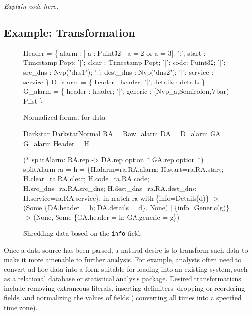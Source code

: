 \emph{Explain code here.}


\subsection{Example: Transformation}
\label{sec:ex-trans}

\begin{figure}
  \centering
  \begin{code}\scriptsize
{} Header = \{
       alarm : [ a : Puint32 | a = 2 or a = 3];
 ':';  start :  Timestamp Popt;
 '|';  clear :  Timestamp Popt;
 '|';  code: Puint32;
 '|';  src\_dns  :  Nvp("dns1");
 ';';  dest\_dns :  Nvp("dns2");
 '|';  service  : service
\}
\mbox{}
 D\_alarm = \{
       header   : header;
 '|';  details  : details
 \}
\mbox{}
 G\_alarm = \{
       header   : header;
 '|';  generic  : (Nvp\_a,Semicolon,Vbar) Plist
\}\end{code}
\caption{Normalized format for \darkstar{} data}
\label{fig:normal-darkstar}
\end{figure}

\begin{figure}
\begin{code}\scriptsize
{} Darkstar
 DarkstarNormal
 RA = Raw\_alarm
 DA = D\_alarm
 GA = G\_alarm
 Header = H

(* splitAlarm: RA.rep -> DA.rep option * GA.rep option *)
 splitAlarm ra =
     h = \{H.alarm=ra.RA.alarm; H.start=ra.RA.start; 
              H.clear=ra.RA.clear; H.code=ra.RA.code;
              H.src\_dns=ra.RA.src\_dns; H.dest\_dns=ra.RA.dest\_dns;
              H.service=ra.RA.service\};
    in match ra with
        \{info=Details(d)\} -> 
        (Some \{DA.header = h; DA.details = d\}, None)
      | \{info=Generic(g)\} ->
        (None, Some \{GA.header = h; GA.generic = g\})    
  \end{code}
  \caption{Shredding \darkstar{} data based on the {\tt info} field.}
  \label{fig:ex-no-err-check}
\end{figure}

Once a data source has been parsed, a natural desire is to transform
such data to make it more amenable to further analysis.  For example,
analysts often need to convert ad hoc data into a form suitable for
loading into an existing system, such as a relational database or
statistical analysis package. Desired transformations include
removing extraneous literals, inserting delimiters, dropping or
reordering fields, and normalizing the values of fields (\eg{}
converting all times into a specified time zone).  

